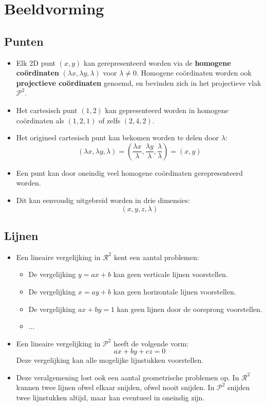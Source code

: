 \chapter{Beeldvorming}
\section{Punten}
\begin{itemize}
	\item Elk 2D punt $(x, y)$ kan gerepresenteerd worden via de \textbf{homogene coördinaten} $(\lambda x, \lambda y, \lambda)$ voor $\lambda \neq 0$. Homogene coördinaten worden ook \textbf{projectieve coördinaten} genoemd, en bevinden zich in het projectieve vlak $\mathcal{P}^2$. 
	\item Het cartesisch punt $(1, 2)$ kan gepresenteerd worden in homogene coördinaten als $(1, 2, 1)$ of zelfs $(2, 4, 2)$.
	\item Het origineel cartesisch punt kan bekomen worden te delen door $\lambda$:
	$$(\lambda x, \lambda y, \lambda) = (\frac{\lambda x}{\lambda}, \frac{\lambda y}{\lambda}, \frac{\lambda}{\lambda}) = (x, y)$$
	\item Een punt kan door oneindig veel homogene coördinaten gerepresenteerd worden.
	\item Dit kan eenvoudig uitgebreid worden in drie dimensies:
	$$(x, y, z, \lambda)$$
\end{itemize}

\section{Lijnen}
\begin{itemize}
	\item Een lineaire vergelijking in $\mathcal{R}^2$ kent een aantal problemen:
	\begin{itemize}
		\item De vergelijking $y = ax + b$ kan geen verticale lijnen voorstellen.
		\item De vergelijking $x = ay + b$ kan geen horizontale lijnen voorstellen.
		\item De vergelijking $ax + by = 1$ kan geen lijnen door de oorsprong voorstellen.
		\item ...
	\end{itemize}
	\item Een lineaire vergelijking in $\mathcal{P}^2$ heeft de volgende vorm:
	$$ax + by + cz = 0$$
	Deze vergelijking kan alle mogelijke lijnstukken voorstellen.
	\item Deze veralgemening lost ook een aantal geometrische problemen op. In $\mathcal{R}^2$ kunnen twee lijnen ofwel elkaar snijden, ofwel nooit snijden. In $\mathcal{P}^2$ snijden twee lijnstukken altijd, maar kan eventueel in oneindig zijn.
\end{itemize}

